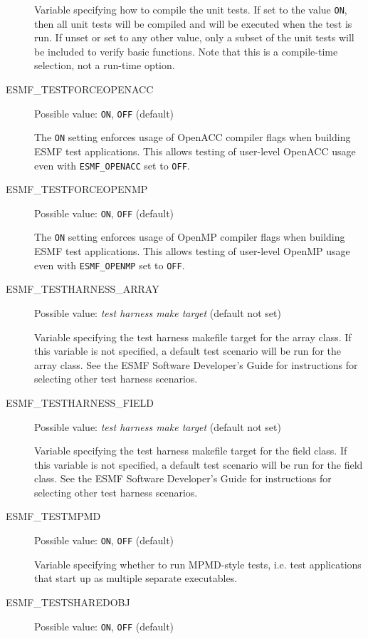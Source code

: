 \begin{description}
Variable specifying how to compile the unit tests. If set to the value {\tt ON},
then all unit tests will be compiled and will be executed when the test is
run.  If unset or set to any other value, only a subset of the unit tests
will be included to verify basic functions. Note that this is a compile-time
selection, not a run-time option.

\item[ESMF\_TESTFORCEOPENACC]
Possible value: {\tt ON}, {\tt OFF} (default)

The {\tt ON} setting enforces usage of OpenACC compiler flags when building ESMF test applications. This allows testing of user-level OpenACC usage even with {\tt ESMF\_OPENACC} set to {\tt OFF}.

\item[ESMF\_TESTFORCEOPENMP]
Possible value: {\tt ON}, {\tt OFF} (default)

The {\tt ON} setting enforces usage of OpenMP compiler flags when building ESMF test applications. This allows testing of user-level OpenMP usage even with {\tt ESMF\_OPENMP} set to {\tt OFF}.

\item[ESMF\_TESTHARNESS\_ARRAY]
Possible value: {\em test harness make target} (default not set)

Variable specifying the test harness makefile target for the array class.  If this variable is not specified, a default test scenario will be run for the array class.  See the ESMF Software Developer's Guide for instructions for selecting other test harness scenarios.

\item[ESMF\_TESTHARNESS\_FIELD]
Possible value: {\em test harness make target} (default not set)

Variable specifying the test harness makefile target for the field class.  If this variable is not specified, a default test scenario will be run for the field class.  See the ESMF Software Developer's Guide for instructions for selecting other test harness scenarios.

\item[ESMF\_TESTMPMD]
Possible value: {\tt ON}, {\tt OFF} (default)

Variable specifying whether to run MPMD-style tests, i.e. test applications
that start up as multiple separate executables.

\item[ESMF\_TESTSHAREDOBJ]
Possible value: {\tt ON}, {\tt OFF} (default)


\end{description}
